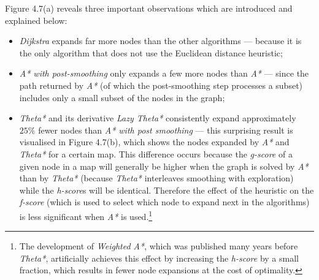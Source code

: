 \documentclass[12pt,notitlepage]{report}
\begin{document}
\noindent
Figure 4.7(a) reveals three important observations which are introduced and explained below:
\begin{itemize}
\item {\em Dijkstra} expands far more nodes than the other algorithms --- because it is the only algorithm that does not use the Euclidean distance heuristic;
\item {\em A* with post-smoothing} only expands a few more nodes than {\em A*} --- since the path returned by {\em A*} (of which the post-smoothing step processes a subset) includes only a small subset of the nodes in the graph;
\item {\em Theta*} and its derivative {\em Lazy Theta*} consistently expand approximately $25\%$ fewer nodes than {\em A* with post smoothing} --- this surprising result is visualised in Figure 4.7(b), which shows the nodes expanded by {\em A*} and {\em Theta*} for a certain map. This difference occurs because the {\em g-score} of a given node in a map will generally be higher when the graph is solved by {\em A*} than by {\em Theta*} (because {\em Theta*} interleaves smoothing with exploration) while the {\em h-score}s will be identical. Therefore the effect of the heuristic on the {\em f-score} (which is used to select which node to expand next in the algorithms) is less significant when {\em A*} is used.\footnote{The development of {\em Weighted A*}\cite{Pearl84}, which was published many years before {\em Theta*}, artificially achieves this effect by increasing the {\em h-score} by a small fraction, which results in fewer node expansions at the cost of optimality.}
\end{itemize}
\end{document}
